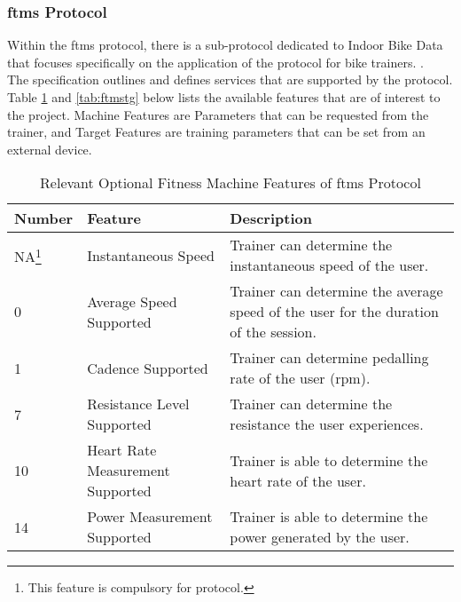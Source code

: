 \subsubsection{\ac{ftms} Protocol}\label{sec:ftms}
Within the \ac{ftms} protocol, there is a sub-protocol dedicated to Indoor Bike Data that focuses specifically on the application of the protocol for bike trainers. \cite[section ~4.9]{BLSIG:2017}.\\
The specification outlines and defines services that are supported by the protocol. Table \ref{tab:ftmsft} and \ref{tab:ftmstg} below lists the available features that are of interest to the project. Machine Features are Parameters that can be requested from the trainer, and Target Features are training parameters that can be set from an external device. \citep{BLSIG:2017}

\begin{minipage}{\textwidth}
	\begin{table}[H]
		\renewcommand{\arraystretch}{1.2}
		\centering
		\caption{Relevant Optional Fitness Machine Features of \ac{ftms} Protocol}
		\begin{tabularx}{\textwidth}{p{1.4cm} >{\raggedright}p{5cm} >{\raggedright\arraybackslash}X}
			\toprule
			Number                                                & Feature                          & Description                                                                          \\
			\midrule
			NA\footnote{This feature is compulsory for protocol.} & Instantaneous Speed              & Trainer can determine the instantaneous speed of the user.                           \\
			0                                                     & Average Speed Supported          & Trainer can determine the average speed of the user for the duration of the session. \\
			1                                                     & Cadence Supported                & Trainer can determine pedalling rate of the user (rpm).                              \\
			7                                                     & Resistance Level Supported       & Trainer can determine the resistance the user experiences.                           \\
			10                                                    & Heart Rate Measurement Supported & Trainer is able to determine the heart rate of the user.                             \\
			14                                                    & Power Measurement Supported      & Trainer is able to determine the power generated by the user.                        \\
			\bottomrule
		\end{tabularx}
		\label{tab:ftmsft}
	\end{table}
\end{minipage}

